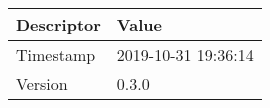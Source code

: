 \begin{tabular}{|l|l|}
\hline
Descriptor & Value\\
\hline
\hline
Timestamp & 2019-10-31 19:36:14\\
\hline
Version & 0.3.0\\
\hline
\end{tabular}